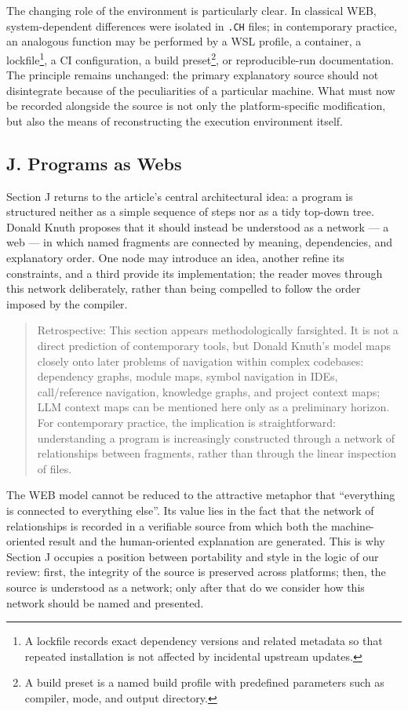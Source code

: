 \documentclass{ZGJournalArticle_2026}
\begin{document}
The changing role of the environment is particularly clear. In classical
WEB, system-dependent differences were isolated in \texttt{.CH} files;
in contemporary practice, an analogous function may be performed by a
WSL profile, a container, a lockfile\footnote{A lockfile records exact
  dependency versions and related metadata so that repeated installation
  is not affected by incidental upstream updates.}, a CI configuration,
a build preset\footnote{A build preset is a named build profile with
  predefined parameters such as compiler, mode, and output directory.},
or reproducible-run documentation. The principle remains unchanged: the
primary explanatory source should not disintegrate because of the
peculiarities of a particular machine. What must now be recorded
alongside the source is not only the platform-specific modification, but
also the means of reconstructing the execution environment itself.

\subsection{J. Programs as Webs}\label{j.-programs-as-webs}

Section J returns to the article's central architectural idea: a program
is structured neither as a simple sequence of steps nor as a tidy
top-down tree. Donald Knuth proposes that it should instead be
understood as a network --- a web --- in which named fragments are
connected by meaning, dependencies, and explanatory order. One node may
introduce an idea, another refine its constraints, and a third provide
its implementation; the reader moves through this network deliberately,
rather than being compelled to follow the order imposed by the compiler.

\begin{quote}
Retrospective: This section appears methodologically farsighted. It is
not a direct prediction of contemporary tools, but Donald Knuth's model
maps closely onto later problems of navigation within complex codebases:
dependency graphs, module maps, symbol navigation in IDEs,
call/reference navigation, knowledge graphs, and project context maps;
LLM context maps can be mentioned here only as a preliminary horizon.
For contemporary practice, the implication is straightforward:
understanding a program is increasingly constructed through a network of
relationships between fragments, rather than through the linear
inspection of files.
\end{quote}

The WEB model cannot be reduced to the attractive metaphor that
``everything is connected to everything else''. Its value lies in the
fact that the network of relationships is recorded in a verifiable
source from which both the machine-oriented result and the
human-oriented explanation are generated. This is why Section J occupies
a position between portability and style in the logic of our review:
first, the integrity of the source is preserved across platforms; then,
the source is understood as a network; only after that do we consider
how this network should be named and presented.
\end{document}

